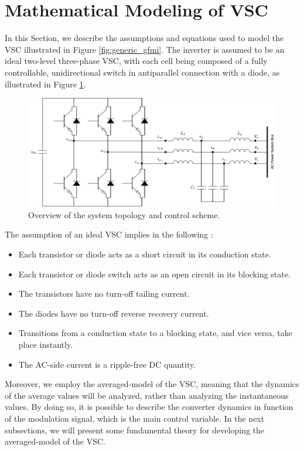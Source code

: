 \section{Mathematical Modeling of VSC} \label{sec:modeling_vsc}

In this Section, we describe the assumptions and equations used to model the VSC
illustrated in Figure \ref{fig:generic_gfmi}. The inverter is assumed to be an
ideal two-level three-phase VSC, with each cell being composed of a fully
controllable, unidirectional switch in antiparallel connection with a diode, as
illustrated in Figure \ref{fig:VSC}.

\begin{figure}[ht!]
    \centering
    \includegraphics[width=12cm]{images/VSC.png}
    \caption{Overview of the system topology and control scheme.}
    \label{fig:VSC}
\end{figure}

The assumption of an ideal VSC implies in the following \cite{yazdani2010voltage}:
\begin{itemize}
    \item Each transistor or diode acts as a short circuit in its conduction state.
    \item Each transistor or diode switch acts as an open circuit in its blocking state.
    \item The transistors have no turn-off tailing current.
    \item The diodes have no turn-off reverse recovery current.
    \item Transitions from a conduction state to a blocking state, and vice versa, take place instantly.
    \item The AC-side current is a ripple-free DC quantity.
\end{itemize}

Moreover, we employ the averaged-model of the VSC, meaning that the dynamics of
the average values will be analyzed, rather than analyzing the instantaneous
values. By doing so, it is possible to describe the converter dynamics in
function of the modulation signal, which is the main control variable. In the
next subsections, we will present some fundamental theory for developing the
averaged-model of the VSC.

